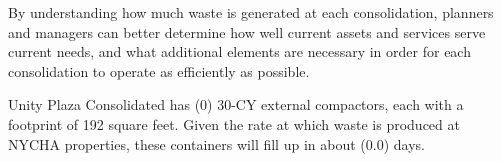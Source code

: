 
    By understanding how much waste is generated at each consolidation, planners and managers
    can better determine how well current assets and services serve current needs, and what additional 
    elements are necessary in order for each consolidation to operate as efficiently as possible. 

    Unity Plaza Consolidated has (0) 30-CY external compactors, each with a footprint of 192 square feet. Given the rate at which waste is produced at NYCHA properties, these containers will fill
    up in about (0.0) days.